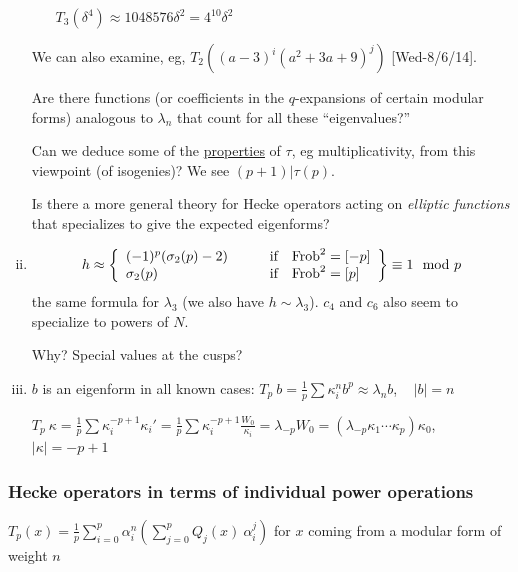 \documentclass{rs}
\theoremstyle{definition}
\theoremstyle{remark}
\newcommand{\Frob}{{\rm Frob}}
\newcommand{\md}{~~{\rm mod}~}
\newcommand{\A}{\alpha}
\renewcommand{\d}{\delta}
\newcommand{\K}{\kappa}
\renewcommand{\l}{\lambda}
\newcommand{\si}{\sigma}
\newcommand{\T}{\tau}
\renewcommand{\=}{\approx}
\renewcommand{\-}{\sim}
\numberwithin{equation}{section}
\numberwithin{thm}{section}
\begin{document}
\begin{enumerate}[(i)]
\begin{itemize}
  $T_3(\d^4) \= 1048576 \d^2 = 4^{10} \d^2$ 
 \end{itemize}
 We can also examine, eg, $T_2((a - 3)^i (a^2 + 3 a + 9)^j)$ [Wed-8/6/14].  

 Are there functions (or coefficients in the $q$-expansions of certain modular forms) analogous to $\l_n$ that count for all these ``eigenvalues?''  

 Can we deduce some of the \href{http://en.wikipedia.org/wiki/Ramanujan_tau_function}{properties} of $\T$, 
 eg multiplicativity, from this viewpoint (of isogenies)?  
 We see $(p + 1) | \T(p)$.  

 Is there a more general theory for Hecke operators acting on {\em elliptic functions} 
 that specializes to give the expected eigenforms?  

 \item 
 \[
  h \= \left\{
  \begin{array}{ll}
   (-1)^p (\si_2(p) - 2) & \qquad \text{if ~ $\Frob^2 = [-p]$} \\
   \si_2(p) & \qquad \text{if ~ $\Frob^2 = [p]$} 
  \end{array}
  \right\} \equiv 1 \md p 
 \]
 the same formula for $\l_3$ (we also have $h \- \l_3$).  
 $c_4$ and $c_6$ also seem to specialize to powers of $N$.  

 Why?  Special values at the cusps?  

 \item \label{Tb} $b$ is an eigenform in all known cases: $\displaystyle T_p ~ b = \frac{1}{p} \sum \K_i^n b^p \= \l_n b$, ~ $|b| = n$ 

 $\displaystyle T_p ~ \K = \frac{1}{p} \sum \K_i^{-p+1} \K_i' = \frac{1}{p} \sum \K_i^{-p+1} \frac{W_0}{\K_i} = \l_{-p} W_0 = (\l_{-p} \K_1 \cdots \K_p) \K_0$, ~ $|\K| = -p + 1$ 
\end{enumerate}
 

\subsubsection{Hecke operators in terms of individual power operations}

$\displaystyle T_p(x) = \frac{1}{p} \sum_{i=0}^p \A_i^n \left( \sum_{j=0}^p Q_j(x) ~ \A_i^j \right)$ \quad for $x$ coming from a modular form of weight $n$ 
\end{document}
